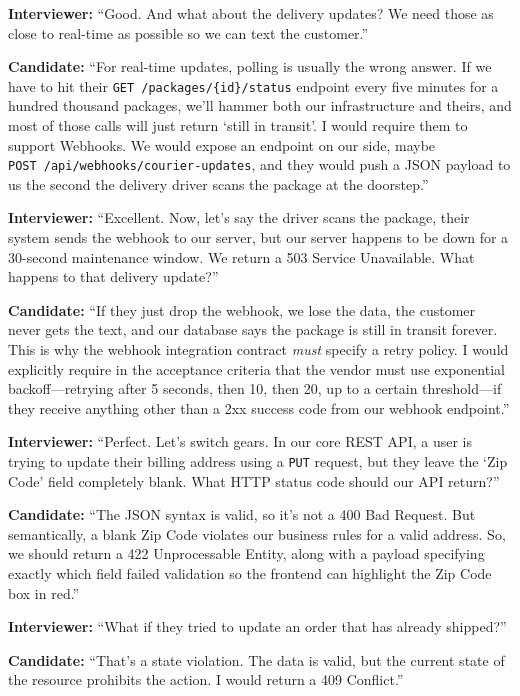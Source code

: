 \textbf{Interviewer:} ``Good. And what about the delivery updates? We
need those as close to real-time as possible so we can text the
customer.''

\textbf{Candidate:} ``For real-time updates, polling is usually the
wrong answer. If we have to hit their
\texttt{GET\ /packages/\{id\}/status} endpoint every five minutes for a
hundred thousand packages, we'll hammer both our infrastructure and
theirs, and most of those calls will just return `still in transit'. I
would require them to support Webhooks. We would expose an endpoint on
our side, maybe \texttt{POST\ /api/webhooks/courier-updates}, and they
would push a JSON payload to us the second the delivery driver scans the
package at the doorstep.''

\textbf{Interviewer:} ``Excellent. Now, let's say the driver scans the
package, their system sends the webhook to our server, but our server
happens to be down for a 30-second maintenance window. We return a 503
Service Unavailable. What happens to that delivery update?''

\textbf{Candidate:} ``If they just drop the webhook, we lose the data,
the customer never gets the text, and our database says the package is
still in transit forever. This is why the webhook integration contract
\emph{must} specify a retry policy. I would explicitly require in the
acceptance criteria that the vendor must use exponential
backoff---retrying after 5 seconds, then 10, then 20, up to a certain
threshold---if they receive anything other than a 2xx success code from
our webhook endpoint.''

\textbf{Interviewer:} ``Perfect. Let's switch gears. In our core REST
API, a user is trying to update their billing address using a
\texttt{PUT} request, but they leave the `Zip Code' field completely
blank. What HTTP status code should our API return?''

\textbf{Candidate:} ``The JSON syntax is valid, so it's not a 400 Bad
Request. But semantically, a blank Zip Code violates our business rules
for a valid address. So, we should return a 422 Unprocessable Entity,
along with a payload specifying exactly which field failed validation so
the frontend can highlight the Zip Code box in red.''

\textbf{Interviewer:} ``What if they tried to update an order that has
already shipped?''

\textbf{Candidate:} ``That's a state violation. The data is valid, but
the current state of the resource prohibits the action. I would return a
409 Conflict.''

